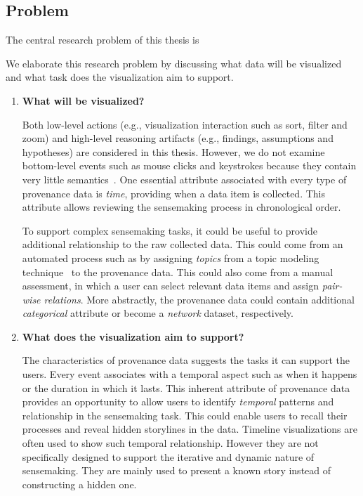\subsection{Problem}
The central research problem of this thesis is
\begin{center}
\end{center}

We elaborate this research problem by discussing what data will be visualized and what task does the visualization aim to support.

\begin{enumerate}
	\item \textbf{What  will be visualized?}
	
	Both low-level actions (e.g., visualization interaction such as sort, filter and zoom) and high-level reasoning artifacts (e.g., findings, assumptions and hypotheses) are considered in this thesis. However, we do not examine bottom-level events such as mouse clicks and keystrokes because they contain very little semantics~\cite{Gotz2009}. One essential attribute associated with every type of provenance data is \emph{time}, providing when a data item is collected. This attribute allows reviewing the sensemaking process in chronological order.
	
	To support complex sensemaking tasks, it could be useful to provide additional relationship to the raw collected data. This could come from an automated process such as by assigning \emph{topics} from a topic modeling technique~\cite{Blei2003} to the provenance data. This could also come from a manual assessment, in which a user can select relevant data items and assign \emph{pair-wise relations}. More abstractly, the provenance data could contain additional \emph{categorical} attribute or become a \emph{network} dataset, respectively.
	
	\item \textbf{What  does the visualization aim to support?}
	
	The characteristics of provenance data suggests the tasks it can support the users. Every event associates with a temporal aspect such as when it happens or the duration in which it lasts. This inherent attribute of provenance data provides an opportunity to allow users to identify \emph{temporal} patterns and relationship in the sensemaking task. This could enable users to recall their processes and reveal hidden storylines in the data. Timeline visualizations are often used to show such temporal relationship. However they are not specifically designed to support the iterative and dynamic nature of sensemaking. They are mainly used to present a known story instead of constructing a hidden one.
	

\end{enumerate}
